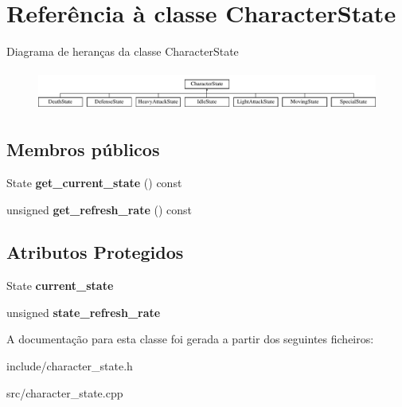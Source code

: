 \hypertarget{classCharacterState}{}\section{Referência à classe Character\+State}
\label{classCharacterState}
Diagrama de heranças da classe Character\+State\begin{figure}[H]
\begin{center}
\leavevmode
\includegraphics[height=1.333333cm]{classCharacterState}
\end{center}
\end{figure}
\subsection*{Membros públicos}
\begin{DoxyCompactItemize}
\item 
\mbox{\label{classCharacterState_ac10645ca9c8c395e8affcbf9ed2b8555}} 
State {\bfseries get\+\_\+current\+\_\+state} () const
\item 
\mbox{\label{classCharacterState_a54f2a5295b59778437cd7097fd78b065}} 
unsigned {\bfseries get\+\_\+refresh\+\_\+rate} () const
\end{DoxyCompactItemize}
\subsection*{Atributos Protegidos}
\begin{DoxyCompactItemize}
\item 
\mbox{\label{classCharacterState_a8f034f034b94ccf269d65423f51aa7ec}} 
State {\bfseries current\+\_\+state}
\item 
\mbox{\label{classCharacterState_ac9da3ddf82281b73f8e9471f9cfc9438}} 
unsigned {\bfseries state\+\_\+refresh\+\_\+rate}
\end{DoxyCompactItemize}


A documentação para esta classe foi gerada a partir dos seguintes ficheiros\+:\begin{DoxyCompactItemize}
\item 
include/character\+\_\+state.\+h\item 
src/character\+\_\+state.\+cpp\end{DoxyCompactItemize}
